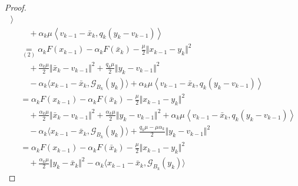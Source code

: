 \documentclass[12pt]{article}
\begin{document}
\begin{proof}
{\begin{align*}
                    \rangle
                    \\&\quad 
                    + \alpha_k \mu
                    \left\langle 
                        v_{k - 1} - \bar x_k, 
                        q_k(y_k - v_{k - 1}) 
                    \right\rangle
                \\
                &\underset{(2)}{=} 
                \alpha_kF(x_{k - 1}) - \alpha_k F(\bar x_k)
                - \frac{\mu}{2}\Vert x_{k - 1} - y_k\Vert^2 
                    \\&\quad 
                    + \frac{\alpha_k \mu}{2}
                    \Vert \bar x_k - v_{k - 1}\Vert^2
                    + \frac{q_k\mu}{2}\Vert y_k - v_{k - 1} \Vert^2
                    \\ &\quad 
                    - \alpha_k\langle
                        x_{k - 1} - \bar x_k, 
                        \mathcal G_{B_k}(y_k)
                    \rangle
                    + \alpha_k \mu
                    \left\langle 
                        v_{k - 1} - \bar x_k, 
                        q_k(y_k - v_{k - 1}) 
                    \right\rangle
                \\
                &=
                \alpha_kF(x_{k - 1}) - \alpha_k F(\bar x_k)
                - \frac{\mu}{2}\Vert x_{k - 1} - y_k\Vert^2 
                    \\&\quad 
                    + \frac{\alpha_k \mu}{2}
                    \Vert \bar x_k - v_{k - 1}\Vert^2
                    + \frac{\alpha_k\mu}{2}\Vert y_k - v_{k - 1}\Vert^2
                    + \alpha_k \mu
                    \left\langle 
                        v_{k - 1} - \bar x_k, 
                        q_k(y_k - v_{k - 1}) 
                    \right\rangle
                    \\ &\quad 
                    - \alpha_k\langle
                        x_{k - 1} - \bar x_k, 
                        \mathcal G_{B_k}(y_k)
                    \rangle
                    + \frac{q_k\mu - \mu\alpha_k}{2}\Vert y_k - v_{k - 1} \Vert^2
                \\
                &= 
                \alpha_kF(x_{k - 1}) - \alpha_k F(\bar x_k)
                - \frac{\mu}{2}\Vert x_{k - 1} - y_k\Vert^2 
                    \\&\quad 
                    + \frac{\alpha_k\mu}{2}\Vert y_k - \bar x_k\Vert^2
                    - \alpha_k\langle
                        x_{k - 1} - \bar x_k, 
                        \mathcal G_{B_k}(y_k)
                    \rangle

\end{align*}}
\end{proof}
\end{document}
